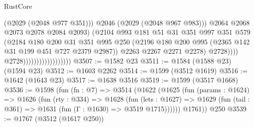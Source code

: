 \begin{lexlean}{RustCore}
\begin{coremodule}
                                                    (@2029 (@2048 @977 @351)))
                                                  @2046
                                                  (@2029 (@2048 @967 @983)))
                                                @2064
                                                @2068
                                                @2073
                                                @2078
                                                @2084
                                                @2093)
                                              (@2104
                                                @993
                                                @181
                                                @51
                                                @31
                                                @351
                                                @997
                                                @351
                                                @579
                                                (@2184
                                                  @180
                                                  @200
                                                  @31
                                                  @351
                                                  @995
                                                  @250
                                                  (@2196
                                                    @180
                                                    @200
                                                    @995
                                                    (@2365 @142 @31 @199 @451 @727 @2379 @2987))
                                                  @2263
                                                  @2267
                                                  @2271
                                                  @2278)
                                                @2728))))
                                        @2728))))))))))))))))))
@3507 := @1582 @23
@3511 := @1584 (@1588 @23) (@1594 @23)
@3512 := @1603 @2262
@3514 := @1599 (@3512 @1619)
@3516 := @1642 (@1643 @23)
@3517 := @1638 @3516
@3519 := @1599 (@3517 @1668)
@3536 := @1598
    (fun (fn : @7) =>
    @3514
      (@1622
        (@1625
          (fun (params : @1624) =>
          @1626
            (fun (rty : @334) =>
            @1628
              (fun (lets : @1627) =>
              @1629 (fun (tail : @361) => @1631 (fun (Γ : @1630) => @3519 @1715))))))
        @1761))
    @250
@3539 := @1767 (@3512 (@1617 @250))

\end{coremodule}
\end{lexlean}

